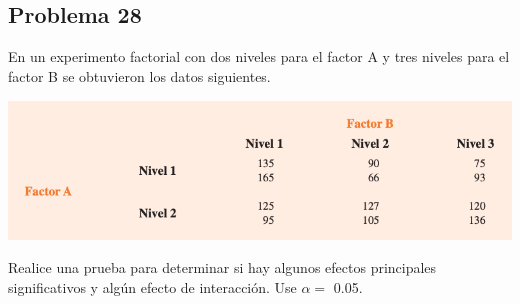 \documentclass[a4paper,12pt]{article}
\begin{document}
\subsection{Problema 28}
En un experimento factorial con dos niveles para el factor A y tres niveles para el factor B se obtuvieron los datos siguientes.
\begin{center}
    \includegraphics[scale=0.5]{Images/28.png}
\end{center}
Realice una prueba para determinar si hay algunos efectos principales significativos y algún efecto de interacción. Use $\alpha=$  0.05.
\end{document}
